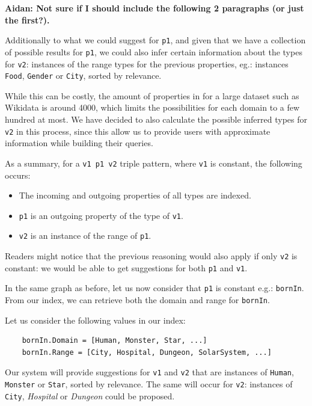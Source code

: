 \textbf{Aidan: Not sure if I should include the following 2 paragraphs (or just the first?).}

Additionally to what we could suggest for \texttt{p1}, and given that we have a collection of possible results for \texttt{p1}, we could also infer certain information about the types for \texttt{v2}: instances of the range types for the previous properties, eg.: instances \texttt{Food}, \texttt{Gender} or \texttt{City}, sorted by relevance.

While this can be costly, the amount of properties in for a large dataset such as Wikidata is around 4000, which limits the possibilities for each domain to a few hundred at most. We have decided to also calculate the possible inferred types for \texttt{v2} in this process, since this allow us to provide users with approximate information while building their queries. 

As a summary, for a \texttt{v1 p1 v2} triple pattern, where \texttt{v1} is constant, the following occurs:
\begin{itemize}
    \item The incoming and outgoing properties of all types are indexed.
    \item \texttt{p1} is an outgoing property of the type of \texttt{v1}.
    \item \texttt{v2} is an instance of the range of \texttt{p1}.
\end{itemize}

Readers might notice that the previous reasoning would also apply if only \texttt{v2} is constant: we would be able to get suggestions for both \texttt{p1} and \texttt{v1}.

\begin{example}
In the same graph as before, let us now consider that \texttt{p1} is constant e.g.: \texttt{bornIn}. From our index, we can retrieve both the domain and range for \texttt{bornIn}. 

Let us consider the following values in our index:
\begin{verbatim}
    bornIn.Domain = [Human, Monster, Star, ...]
    bornIn.Range = [City, Hospital, Dungeon, SolarSystem, ...]
\end{verbatim}

Our system will provide suggestions for \texttt{v1} and \texttt{v2} that are instances of \texttt{Human}, \texttt{Monster} or \texttt{Star}, sorted by relevance. The same will occur for \texttt{v2}: instances of \texttt{City}, \textit{Hospital} or \textit{Dungeon} could be proposed.

\end{example}

